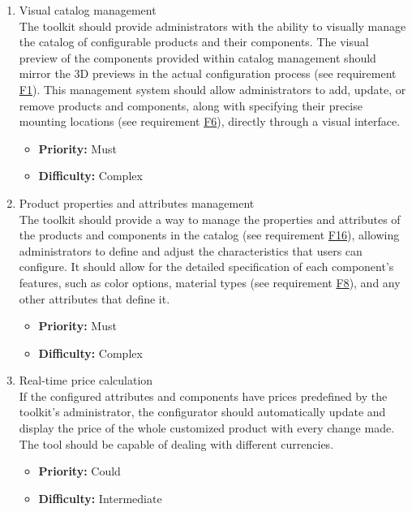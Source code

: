 \begin{enumerate}[label=\textbf{F\arabic*:}, leftmargin=*]
\item \label{itm:F16} Visual catalog management
\vspace{2pt}
\\The toolkit should provide administrators with the ability to visually manage the catalog of configurable products and their components. The visual preview of the components provided within catalog management should mirror the 3D previews in the actual configuration process (see requirement \hyperref[itm:F1]{F1}). This management system should allow administrators to add, update, or remove products and components, along with specifying their precise mounting locations (see requirement \hyperref[itm:F6]{F6}), directly through a visual interface.
\begin{itemize}[noitemsep, label=\trianglebullet]
    \item \textbf{Priority:} Must
    \item \textbf{Difficulty:} Complex
\end{itemize}
\vspace{4pt}

\item \label{itm:F17} Product properties and attributes management
\vspace{2pt}
\\The toolkit should provide a way to manage the properties and attributes of the products and components in the catalog (see requirement \hyperref[itm:F16]{F16}), allowing administrators to define and adjust the characteristics that users can configure. It should allow for the detailed specification of each component's features, such as color options, material types (see requirement \hyperref[itm:F8]{F8}), and any other attributes that define it.
\begin{itemize}[noitemsep, label=\trianglebullet]
    \item \textbf{Priority:} Must
    \item \textbf{Difficulty:} Complex
\end{itemize}
\vspace{4pt}


\item \label{itm:F18} Real-time price calculation
\vspace{2pt}
\\If the configured attributes and components have prices predefined by the toolkit's administrator, the configurator should automatically update and display the price of the whole customized product with every change made. The tool should be capable of dealing with different currencies.
\begin{itemize}[noitemsep, label=\trianglebullet]
    \item \textbf{Priority:} Could
    \item \textbf{Difficulty:} Intermediate
\end{itemize}
\vspace{4pt}


\end{enumerate}
